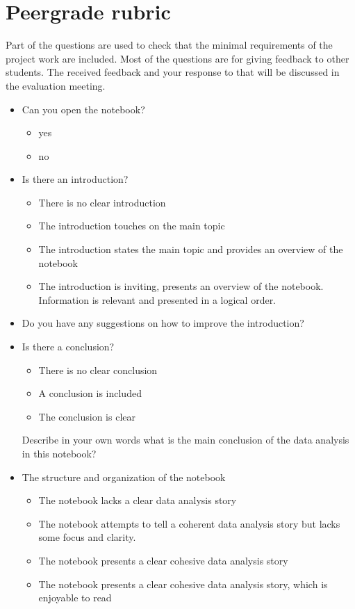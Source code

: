 \documentclass[a4paper,11pt]{article}
\begin{document}
\section*{Peergrade rubric}

Part of the questions are used to check that the minimal requirements
of the project work are included. Most of the questions are for giving
feedback to other students. The received feedback and your response to
that will be discussed in the evaluation meeting.

\begin{itemize}
\item Can you open the notebook?
\begin{itemize}
\item yes
\item no
\end{itemize}

\item Is there an introduction? 
  \begin{itemize}
  \item There is no clear introduction
  \item The introduction touches on the main topic
  \item The introduction states the main topic and provides an overview of the notebook
  \item The introduction is inviting, presents an overview of the
    notebook. Information is relevant and presented in a logical
    order.
\end{itemize}

\item Do you have any suggestions on how to improve the introduction?

\item Is there a conclusion? 
  \begin{itemize}
  \item There is no clear conclusion
  \item A conclusion is included
  \item The conclusion is clear
  \end{itemize}
  
Describe in your own words what is the main conclusion of the data analysis in this notebook?

\item The structure and organization of the notebook
  \begin{itemize}
  \item The notebook lacks a clear data analysis story
  \item The notebook attempts to tell a coherent data analysis story but lacks some focus and clarity.
  \item The notebook presents a clear cohesive data analysis story
  \item The notebook presents a clear cohesive data analysis
    story, which is enjoyable to read
  \end{itemize}
  

\end{itemize}
\end{document}
